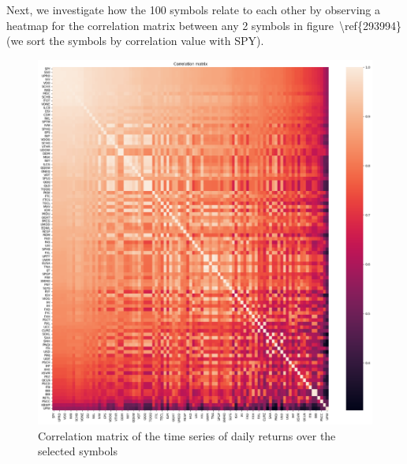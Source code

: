 \documentclass[10pt]{article}
\begin{document}
Next, we investigate how the 100 symbols relate to each other by
observing a heatmap for the correlation matrix between any 2 symbols in
figure~{\textbackslash ref\{293994\}} (we sort the symbols by
correlation value with SPY).~
\begin{figure}[H]
\begin{center}
\includegraphics[width=0.98\columnwidth]{figures/output5/output5}
\caption{{Correlation matrix of the time series of daily returns over the selected
symbols
{\label{293994}}%
}}
\end{center}
\end{figure}
\end{document}

